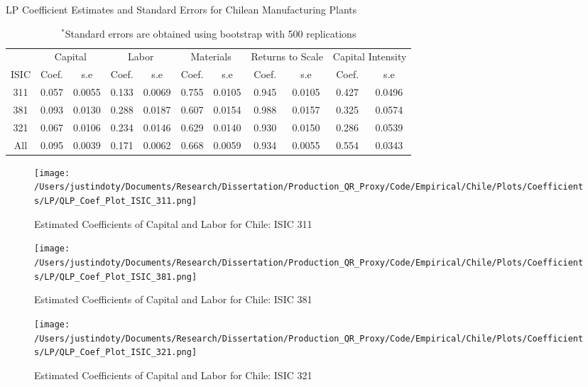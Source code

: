 \documentclass[11pt]{article}
\begin{document}
\begin{table}[H]
\centering
\caption{LP Coefficient Estimates and Standard Errors for Chilean Manufacturing Plants}
\begin{tabular}{ccccccccccc}
  \hline\hline & \multicolumn{2}{c}{Capital} & \multicolumn{2}{c}{Labor} & \multicolumn{2}{c}{Materials} & \multicolumn{2}{c}{Returns to Scale} & \multicolumn{2}{c}{Capital Intensity}\\ \cmidrule(lr){2-3} \cmidrule(lr){4-5} \cmidrule(lr){6-7} \cmidrule(lr){8-9} \cmidrule(lr){10-11}ISIC & Coef. & s.e & Coef. & s.e & Coef. & s.e & Coef. & s.e & Coef. & s.e \\ 
  \hline
311 & 0.057 & 0.0055 & 0.133 & 0.0069 & 0.755 & 0.0105 & 0.945 & 0.0105 & 0.427 & 0.0496 \\ 
  381 & 0.093 & 0.0130 & 0.288 & 0.0187 & 0.607 & 0.0154 & 0.988 & 0.0157 & 0.325 & 0.0574 \\ 
  321 & 0.067 & 0.0106 & 0.234 & 0.0146 & 0.629 & 0.0140 & 0.930 & 0.0150 & 0.286 & 0.0539 \\ 
  All & 0.095 & 0.0039 & 0.171 & 0.0062 & 0.668 & 0.0059 & 0.934 & 0.0055 & 0.554 & 0.0343 \\ 
   \hline
\end{tabular}
\caption*{\footnotesize $^{*}$Standard errors are obtained using bootstrap with 500 replications}
\label{CHLLPcoef}
\end{table}

\begin{figure}[H]
\centering
\caption{Estimated Coefficients of Capital and Labor for Chile: ISIC 311}
\texttt{[image: /Users/justindoty/Documents/Research/Dissertation/Production\_QR\_Proxy/Code/Empirical/Chile/Plots/Coefficients/LP/QLP\_Coef\_Plot\_ISIC\_311.png]}
\label{fig:LPCHL311}
\end{figure}

\begin{figure}[H]
\centering
\caption{Estimated Coefficients of Capital and Labor for Chile: ISIC 381}
\texttt{[image: /Users/justindoty/Documents/Research/Dissertation/Production\_QR\_Proxy/Code/Empirical/Chile/Plots/Coefficients/LP/QLP\_Coef\_Plot\_ISIC\_381.png]}
\label{fig:LPCHL381}
\end{figure}

\begin{figure}[H]
\centering
\caption{Estimated Coefficients of Capital and Labor for Chile: ISIC 321}
\texttt{[image: /Users/justindoty/Documents/Research/Dissertation/Production\_QR\_Proxy/Code/Empirical/Chile/Plots/Coefficients/LP/QLP\_Coef\_Plot\_ISIC\_321.png]}
\label{fig:LPCHL321}
\end{figure}
\end{document}
